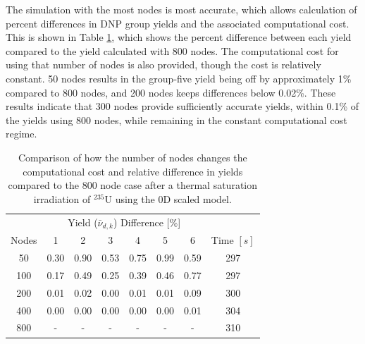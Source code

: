 The simulation with the most nodes is most accurate, which allows calculation of percent differences in \gls{DNP} group yields and the associated computational cost.
This is shown in Table \ref{tab:yield-diff-num-nodes}, which shows the percent difference between each yield compared to the yield calculated with 800 nodes.
The computational cost for using that number of nodes is also provided, though the cost is relatively constant.
50 nodes results in the group-five yield being off by approximately 1\% compared to 800 nodes, and 200 nodes keeps differences below 0.02\%.
These results indicate that 300 nodes provide sufficiently accurate yields, within 0.1\% of the yields using 800 nodes, while remaining in the constant computational cost regime.

\begin{table}[!ht]
    \centering
    \caption{Comparison of how the number of nodes changes the computational cost and relative difference in yields compared to the 800 node case after a thermal saturation irradiation of $^{235}$U using the 0D scaled model.}
\begin{tabular}{cccccccc}
\hline
      & \multicolumn{6}{c}{Yield ($\bar{\nu}_{d,k}$) Difference {[}\%{]}} &              \\
Nodes & 1     & 2     & 3     & 4     & 5     & 6     & Time $[s]$ \\
\hline
50    & 0.30                  & 0.90                  & 0.53                  & 0.75                  & 0.99                  & 0.59                  & 297          \\
100   & 0.17                  & 0.49                  & 0.25                  & 0.39                  & 0.46                  & 0.77                  & 297          \\
200   & 0.01                  & 0.02                  & 0.00                  & 0.01                  & 0.01                  & 0.09                  & 300          \\
400   & 0.00                  & 0.00                  & 0.00                  & 0.00                  & 0.00                  & 0.01                  & 304          \\
800   & -                     & -                     & -                     & -                     & -                     & -                     & 310  \\     
\hline
\end{tabular}
\label{tab:yield-diff-num-nodes}
\end{table}

